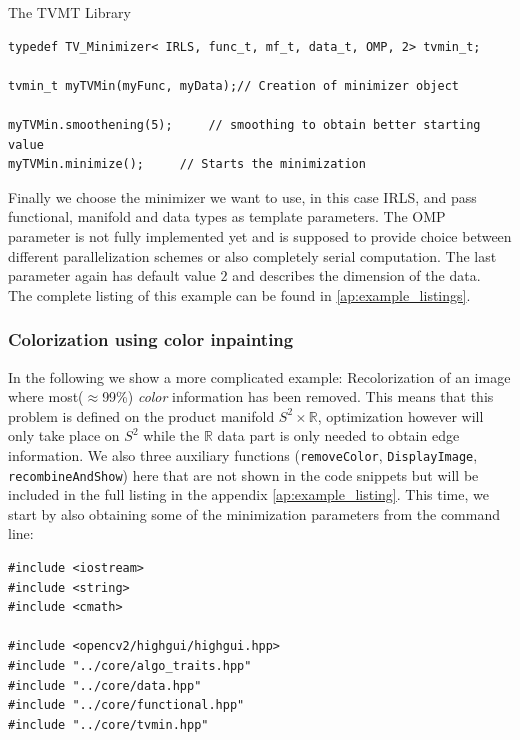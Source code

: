 \begin{chapter}{The TVMT Library}
\cppinline
\begin{lstlisting}[label=code:tut_data,caption={Choosing the minimizer, smoothing and minimization}]
typedef TV_Minimizer< IRLS, func_t, mf_t, data_t, OMP, 2> tvmin_t;

tvmin_t myTVMin(myFunc, myData);// Creation of minimizer object

myTVMin.smoothening(5);		// smoothing to obtain better starting value
myTVMin.minimize();		// Starts the minimization
\end{lstlisting}

Finally we choose the minimizer we want to use, in this case IRLS, and pass functional, manifold and data types as template parameters. The OMP parameter is not fully implemented yet 
and is supposed to provide choice between different parallelization schemes or also completely serial computation. The last parameter again has default value $2$ and describes the 
dimension of the data.\\
The complete listing of this example can be found in \ref{ap:example_listings}.

\subsubsection{Colorization using color inpainting} %
\label{ssub:Color inpainting}
In the following we show a more complicated example: Recolorization of an image where most($\approx$99\%) \textit{color} information has been removed. This means that this
problem is defined on the product manifold $S^2\times \mathbb{R}$, optimization however will only take place on $S^2$ while the $\mathbb{R}$ data part is only needed to obtain
edge information. We also three auxiliary functions (\texttt{removeColor}, \texttt{DisplayImage}, \texttt{recombineAndShow}) here that are not shown in the code snippets but
will be included in the full listing in the appendix \ref{ap:example_listing}. This time, we start by also obtaining some of the minimization parameters from the command line:\\

\cppinline
\begin{lstlisting}[label=code:tut2_init,caption={Include library files and read parameters from standard input}]
#include <iostream>
#include <string>
#include <cmath>

#include <opencv2/highgui/highgui.hpp>
#include "../core/algo_traits.hpp"
#include "../core/data.hpp"
#include "../core/functional.hpp"
#include "../core/tvmin.hpp"


\end{lstlisting}
\end{chapter}
